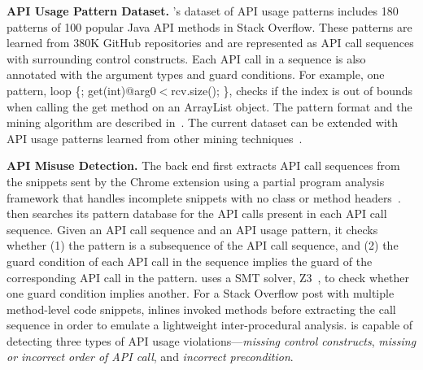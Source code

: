 \begin{table*}[!th]
{\begin{tabular}{|l|l|l|}
\end{tabular}
}
\caption{Description templates for different types of API usage violations. {\textless?\textgreater} and {\textless before/after\textgreater} are instantiated based on API usage violations and correct patterns. The digits in the last column are the Stack Overflow post ids where each example warning message is reported.}
\label{tab:template}
\end{table*}

{\bf API Usage Pattern Dataset.} {\tool}'s dataset of API usage patterns includes 180 patterns of 100 popular Java API methods in Stack Overflow. These patterns are learned from 380K GitHub repositories and are represented as API call sequences with surrounding control constructs. Each API call in a sequence is also annotated with the argument types and guard conditions. For example, one pattern, {\ttt loop \{; get(int)@arg0$<$rcv.size(); \}}, checks if the index is out of bounds when calling the {\ttt get} method on an {\ttt ArrayList} object. The pattern format and the mining algorithm are described in~\cite{zhang2018code}. The current dataset can be extended with API usage patterns learned from other mining techniques~\cite{gruska2010learning, wang2013mining, zhong2009mapo, Nguyen09}. 

{\bf API Misuse Detection.} The back end first extracts API call sequences from the snippets sent by the Chrome extension using a partial program analysis framework that handles incomplete snippets with no class or method headers~\cite{subramanian2014live}. {\tool} then searches its pattern database for the API calls present in each API call sequence. Given an API call sequence and an API usage pattern, it checks whether (1)  the pattern is a subsequence of the API call sequence, and (2) the guard condition of each API call in the sequence implies the guard of the corresponding API call in the pattern. {\tool} uses a SMT solver, Z3~\cite{de2008z3}, to check whether one guard condition implies another. For a Stack Overflow post with multiple method-level code snippets, {\tool} inlines invoked methods before extracting the call sequence in order to emulate a lightweight inter-procedural analysis. {\tool} is capable of detecting three types of API usage violations---{\em missing control constructs}, {\em missing or incorrect order of API call}, and {\em incorrect precondition}.


